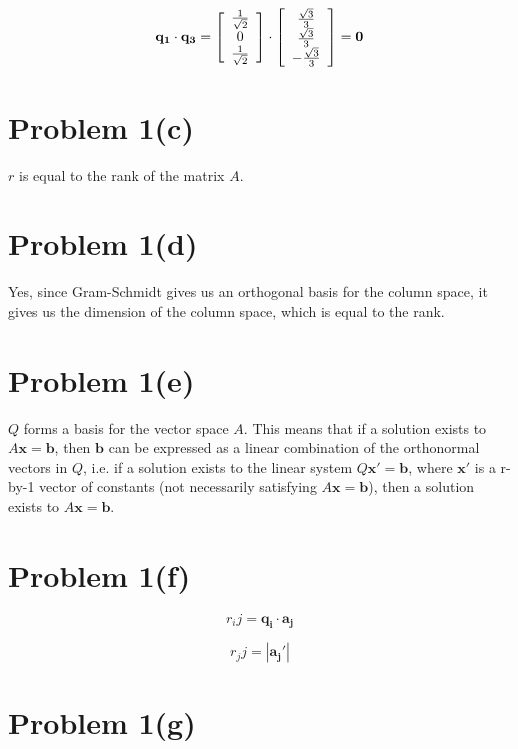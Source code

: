 \documentclass{article}
\begin{document}
$$
\mathbf{q_1} \cdot \mathbf{q_3} = 
\left[ \begin{array} {*{3}c} 
    \frac{1}{\sqrt{2}} \\
    0 \\
    \frac{1}{\sqrt{2}} \\
\end{array}\right] 
\cdot 
\left[ \begin{array} {*{3}c} 
    \frac{\sqrt{3}}{3} \\
    \frac{\sqrt{3}}{3} \\
    - \frac{\sqrt{3}}{3} \\
\end{array}\right]
= \mathbf{0}
$$

\section*{Problem 1(c)}

$r$ is equal to the rank of the matrix $A$.

\section*{Problem 1(d)}

Yes, since Gram-Schmidt gives us an orthogonal basis for the column space, it gives us the dimension of the column space, which is equal to the rank.

\section*{Problem 1(e)}

$Q$ forms a basis for the vector space $A$. This means that if a solution exists to $A\mathbf{x}=\mathbf{b}$, then $\mathbf{b}$ can be expressed as a linear combination of the orthonormal vectors in $Q$, i.e. if a solution exists to the linear system $Q\mathbf{x'}=\mathbf{b}$, where $\mathbf{x'}$ is a r-by-1 vector of constants (not necessarily satisfying $A\mathbf{x}=\mathbf{b}$), then a solution exists to $A\mathbf{x}=\mathbf{b}$.

\section*{Problem 1(f)}


$$ r_ij = \mathbf{q_i} \cdot \mathbf{a_j} $$

$$ r_jj = |\mathbf{a_j'}|$$

\section*{Problem 1(g)}
\end{document}
